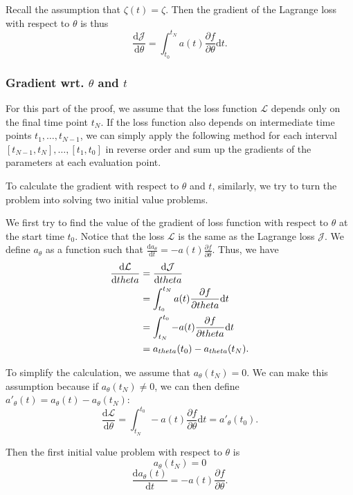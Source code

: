 \documentclass[a4paper,11pt,titlepage]{article}
\theoremstyle{definition}
\theoremstyle{plain}
\theoremstyle{remark}
\begin{document}
Recall the assumption that $\zeta(t)=\zeta$. Then the gradient of the Lagrange loss with respect to $\theta$ is thus
$$
\frac{\mathrm{d}\mathcal{J}}{\mathrm{d}\theta}=\int^{t_N}_{t_0}a(t)\frac{\partial f}{\partial \theta}\mathrm{d}t.
$$

\subsubsection{Gradient wrt. \(\theta\) and \(t\)}

For this part of the proof, we assume that the loss function $\mathcal{L}$ depends only on the final time point $t_N$. If the loss function also depends on intermediate time points $t_1,\dots,t_{N-1}$, we can simply apply the following method for each interval $[t_{N-1},t_N],\dots,[t_1,t_0]$ in reverse order and sum up the gradients of the parameters at each evaluation point.

To calculate the gradient with respect to $\theta$ and $t$, similarly, we try to turn the problem into solving two initial value problems.

We first try to find the value of the gradient of loss function with respect to $\theta$ at the start time $t_0$. Notice that the loss $\mathcal{L}$ is the same as the Lagrange loss $\mathcal{J}$. We define $a_\theta$ as a function such that $\frac{\mathrm{d}a_\theta}{\mathrm{d}t}=-a(t)\frac{\partial f}{\partial \theta}$. Thus, we have
\begin{align}
\frac{\mathrm{d}\mathcal{L}}{\mathrm{d} \theta}&=\frac{\mathrm{d}\mathcal{J}}{\mathrm{d} \theta}\notag\\
&=\int_{t_0}^{t_N}a(t)\frac{\partial f}{\partial \theta}\mathrm{d}t\notag\\
&=\int_{t_N}^{t_0}-a(t)\frac{\partial f}{\partial \theta}\mathrm{d}t\notag\\
&=a_{\theta}(t_0)-a_{\theta}(t_N).\notag
\end{align}

To simplify the calculation, we assume that $a_\theta(t_N)=0$. We can make this assumption because if $a_\theta(t_N)\neq0$, we can then define $a'_\theta(t)=a_\theta(t)-a_\theta(t_N)$:
$$
\frac{\mathrm{d}\mathcal{L}}{\mathrm{d}\theta}=\int_{t_N}^{t_0}-a(t)\frac{\partial f}{\partial \theta}\mathrm{d}t=a'_\theta(t_0).
$$

Then the first initial value problem with respect to $\theta$ is 
$$a_\theta(t_N)=0$$
\begin{equation}\label{eq8}
    \frac{\mathrm{d}a_{\theta}(t)}{\mathrm{d}t} = -a(t)\frac{\partial f}{\partial \theta}.
\end{equation}
\end{document}
